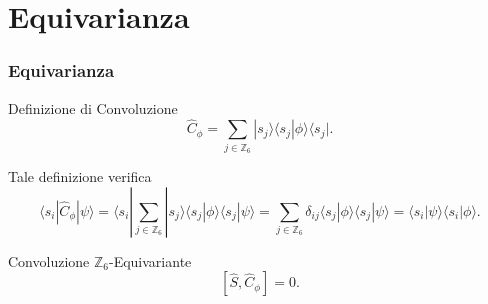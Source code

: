 \documentclass[xcolor=dvipsnames]{beamer}
\newcommand{\Z}{\mathbb{Z}}
\begin{document}
\section{Equivarianza}

\begin{frame}
    \frametitle{Equivarianza}
    \begin{block}{Definizione di Convoluzione}
        \[\widehat{C}_\phi = \sum_{j \in \Z_6} | s_j \rangle \langle s_j | \phi \rangle \langle s_j |.\]
    \end{block} 
    Tale definizione verifica
    \[\langle s_i | \widehat{C}_\phi |\psi \rangle = \langle s_i | \sum_{j \in \Z_6} | s_j\rangle \langle s_j | \phi \rangle \langle s_j |\psi \rangle 
    = \sum_{j \in \Z_6} \delta_{ij} \langle s_j | \phi \rangle \langle s_j |\psi \rangle = \langle s_i | \psi \rangle \langle s_i | \phi \rangle. \]
    \begin{block}{Convoluzione $\Z_6$-Equivariante}
        \Large
        \[ [ \widehat{S}, \widehat{C}_\phi] = 0 .\]
    \end{block}
\end{frame}
\end{document}
